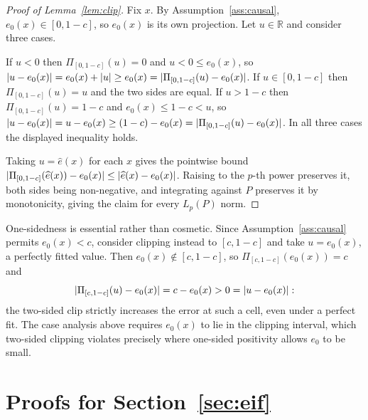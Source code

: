 \documentclass[11pt]{article}
\theoremstyle{plain}
\theoremstyle{definition}
\theoremstyle{remark}
\newcommand{\R}{\mathbb{R}}
\newcommand{\ez}{e_0}
\newcommand{\ehat}{\widehat{e}}
\DeclarePairedDelimiter{\abs}{\lvert}{\rvert}
\begin{document}
\begin{proof}[Proof of Lemma~\ref{lem:clip}]
Fix $x$. By Assumption~\ref{ass:causal}, $\ez(x)\in[0,1-c]$, so $\ez(x)$ is its
own projection. Let $u\in\R$ and consider three cases.

If $u<0$ then $\Pi_{[0,1-c]}(u)=0$ and $u<0\le\ez(x)$, so
$\abs{u-\ez(x)}=\ez(x)+\abs u\ge\ez(x)=\abs{\Pi_{[0,1-c]}(u)-\ez(x)}$.
If $u\in[0,1-c]$ then $\Pi_{[0,1-c]}(u)=u$ and the two sides are equal.
If $u>1-c$ then $\Pi_{[0,1-c]}(u)=1-c$ and $\ez(x)\le1-c<u$, so
$\abs{u-\ez(x)}=u-\ez(x)\ge(1-c)-\ez(x)=\abs{\Pi_{[0,1-c]}(u)-\ez(x)}$.
In all three cases the displayed inequality holds.

Taking $u=\ehat(x)$ for each $x$ gives the pointwise bound
$\abs{\Pi_{[0,1-c]}(\ehat(x))-\ez(x)}\le\abs{\ehat(x)-\ez(x)}$. Raising to the
$p$-th power preserves it, both sides being non-negative, and integrating against
$P$ preserves it by monotonicity, giving the claim for every $L_p(P)$ norm.
\end{proof}

\noindent One-sidedness is essential rather than cosmetic. Since
Assumption~\ref{ass:causal} permits $\ez(x)<c$, consider clipping instead to
$[c,1-c]$ and take $u=\ez(x)$, a perfectly fitted value. Then
$\ez(x)\notin[c,1-c]$, so $\Pi_{[c,1-c]}(\ez(x))=c$ and
\[
  \abs{\Pi_{[c,1-c]}(u)-\ez(x)}=c-\ez(x)>0=\abs{u-\ez(x)} :
\]
the two-sided clip strictly increases the error at such a cell, even under a
perfect fit. The case analysis above requires $\ez(x)$ to lie in the clipping
interval, which two-sided clipping violates precisely where one-sided positivity
allows $\ez$ to be small.

\section{Proofs for Section~\ref{sec:eif}}\label{app:eif}
\end{document}
